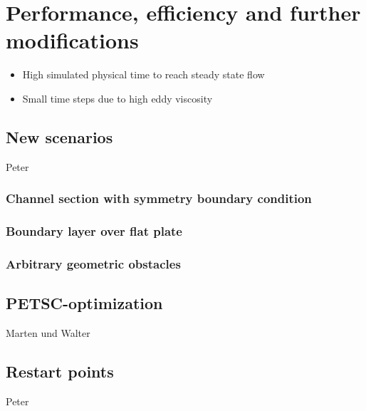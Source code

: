\chapter{Performance, efficiency and further modifications} %
\label{cha:performance_efficiency_and_further_modifications}

\begin{itemize}
  \item High simulated physical time to reach steady state flow
  \item Small time steps due to high eddy viscosity  
\end{itemize}
 
\section{New scenarios} %
\label{sec:new_scenarios}

Peter


\subsection{Channel section with symmetry boundary condition} %
\label{sub:channel_section_with_symmetry_boundary_condition}


\subsection{Boundary layer over flat plate} %
\label{sub:boundary_layer_over_flat_plate}


\subsection{Arbitrary geometric obstacles} %
\label{sub:arbitrary_geometric_obstacles}


\section{PETSC-optimization} %
\label{sec:petsc_optimization}

Marten und Walter


\section{Restart points} %
\label{sec:restart_points}

Peter


